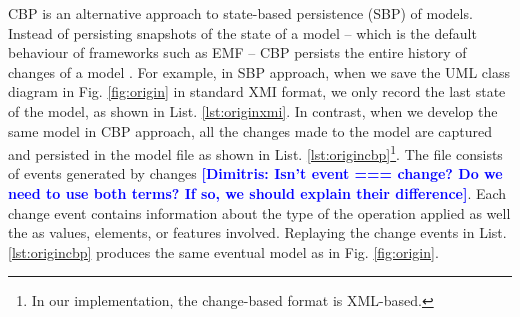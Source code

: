 \documentclass{jot}
\newcommand{\dk}[1]{\textcolor{blue}{\textbf{[Dimitris: #1]}}}
\begin{document}
\vspace{-5pt}
CBP is an alternative approach to state-based persistence (SBP) of models. Instead of persisting snapshots of the state of a model -- which is the default behaviour of frameworks such as EMF -- CBP persists the entire history of changes of a model \cite{yohannis2018towards}. For example, in SBP approach, when we save the UML class diagram in Fig. \ref{fig:origin} in standard XMI format, we only record the last state of the model, as shown in List. \ref{lst:originxmi}. In contrast, when we develop the same model in CBP approach, all the changes made to the model are captured and persisted in the model file as shown in List. \ref{lst:origincbp}\footnote{In our implementation, the change-based format is XML-based.}. The file consists of events generated by changes \dk{Isn't event === change? Do we need to use both terms? If so, we should explain their difference}. Each change event contains information about the type of the operation applied as well the as values, elements, or features involved. Replaying the change events in List. \ref{lst:origincbp} produces the same eventual model as in Fig. \ref{fig:origin}.
\end{document}
